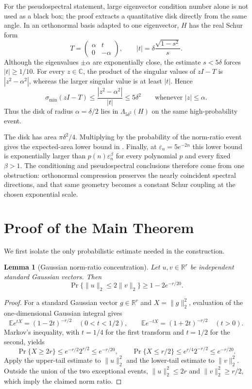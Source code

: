\documentclass[11pt]{article}
\newtheorem{lemma}{Lemma}[section]
\begin{document}
For the pseudospectral statement, large eigenvector condition number alone is
not used as a black box; the proof extracts a quantitative disk directly from
the same angle.  In an orthonormal basis adapted to one eigenvector, $H$ has
the real Schur form
\begin{equation}
  T=\begin{pmatrix}\alpha&t\\0&-\alpha\end{pmatrix},
  \qquad |t|=\delta\frac{\sqrt{1-s^2}}{s}.
  \label{eq:overview-schur}
\end{equation}
Although the eigenvalues $\pm\alpha$ are exponentially close, the estimate
$s<5\delta$ forces $|t|\geq1/10$.  For every $z\in\mathbb C$, the product of
the singular values of $zI-T$ is $|z^2-\alpha^2|$, whereas the larger singular
value is at least $|t|$.  Hence
\[
  \sigma_{\min}(zI-T)
  \leq\frac{|z^2-\alpha^2|}{|t|}
  \leq5\delta^2
  \qquad\text{whenever }|z|\leq\alpha.
\]
Thus the disk of radius $\alpha=\delta/2$ lies in
$\Lambda_{5\delta^2}(H)$ on the same high-probability event.

The disk has area $\pi\delta^2/4$.  Multiplying by the probability of the
norm-ratio event gives the expected-area lower bound in .
Finally, at $\varepsilon_n=5e^{-2n}$ this lower bound is exponentially larger
than $p(n)\varepsilon_n^\beta$ for every polynomial $p$ and every fixed
$\beta>1$.  The conditioning and pseudospectral conclusions therefore come
from one obstruction: orthonormal compression preserves the nearly coincident
spectral directions, and that same geometry becomes a constant Schur coupling
at the chosen exponential scale.

\section{Proof of the Main Theorem}
\label{sec:proof}

We first isolate the only probabilistic estimate needed in the construction.

\begin{lemma}[Gaussian norm-ratio concentration]
\label{lem:gaussian-ratio}
Let $u,v\in\mathbb R^r$ be independent standard Gaussian vectors.  Then
\[
  \Pr\{\lVert u\rVert_2\leq2\lVert v\rVert_2\}
  \geq1-2e^{-r/20}.
\]
\end{lemma}

\begin{proof}
For a standard Gaussian vector $g\in\mathbb R^r$ and
$X=\lVert g\rVert_2^2$, evaluation of the one-dimensional Gaussian integral
gives
\[
  \mathbb E e^{tX}=(1-2t)^{-r/2}\quad(0<t<1/2),
  \qquad
  \mathbb E e^{-tX}=(1+2t)^{-r/2}\quad(t>0).
\]
Markov's inequality, with $t=1/4$ for the first transform and $t=1/2$ for the
second, yields
\[
  \Pr\{X\geq2r\}
  \leq e^{-r/2}2^{r/2}\leq e^{-r/20},
  \qquad
  \Pr\{X\leq r/2\}
  \leq e^{r/4}2^{-r/2}\leq e^{-r/20}.
\]
Apply the upper-tail estimate to $\lVert u\rVert_2^2$ and the lower-tail
estimate to $\lVert v\rVert_2^2$.  Outside the union of the two exceptional
events,
$\lVert u\rVert_2^2\leq2r$ and $\lVert v\rVert_2^2\geq r/2$, which imply the
claimed norm ratio.
\end{proof}
\end{document}
